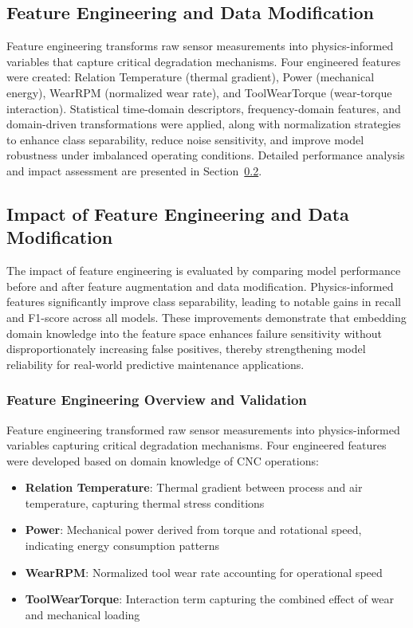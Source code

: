 \subsection{Feature Engineering and Data Modification}
Feature engineering transforms raw sensor measurements into physics-informed variables that capture critical degradation mechanisms. Four engineered features were created: Relation Temperature (thermal gradient), Power (mechanical energy), WearRPM (normalized wear rate), and ToolWearTorque (wear-torque interaction). Statistical time-domain descriptors, frequency-domain features, and domain-driven transformations were applied, along with normalization strategies to enhance class separability, reduce noise sensitivity, and improve model robustness under imbalanced operating conditions. Detailed performance analysis and impact assessment are presented in Section~\ref{sec:feature_engineering_impact}.

\subsection{Impact of Feature Engineering and Data Modification}
\label{sec:feature_engineering_impact}

The impact of feature engineering is evaluated by comparing model performance before and after feature augmentation and data modification. Physics-informed features significantly improve class separability, leading to notable gains in recall and F1-score across all models. These improvements demonstrate that embedding domain knowledge into the feature space enhances failure sensitivity without disproportionately increasing false positives, thereby strengthening model reliability for real-world predictive maintenance applications.

\subsubsection{Feature Engineering Overview and Validation}

Feature engineering transformed raw sensor measurements into physics-informed variables capturing critical degradation mechanisms. Four engineered features were developed based on domain knowledge of CNC operations:

\begin{itemize}
    \item \textbf{Relation Temperature}: Thermal gradient between process and air temperature, capturing thermal stress conditions
    \item \textbf{Power}: Mechanical power derived from torque and rotational speed, indicating energy consumption patterns
    \item \textbf{WearRPM}: Normalized tool wear rate accounting for operational speed
    \item \textbf{ToolWearTorque}: Interaction term capturing the combined effect of wear and mechanical loading
\end{itemize}

